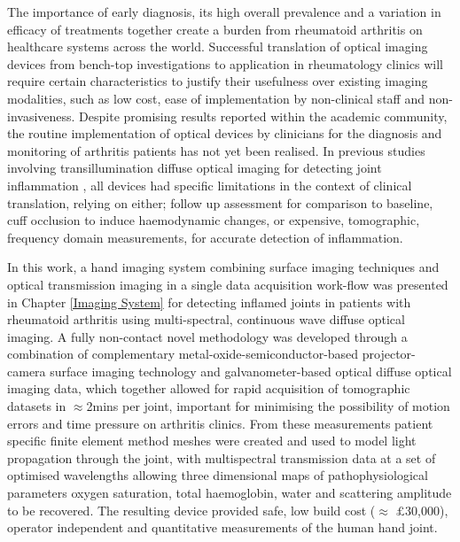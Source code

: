 \documentclass[twoside]{bhamthesis}
\theoremstyle{definition}
\begin{document}
The importance of early diagnosis, its high overall prevalence and a variation in efficacy of treatments together create a burden from rheumatoid arthritis on healthcare systems across the world. Successful translation of optical imaging devices from bench-top investigations to application in rheumatology clinics will require certain characteristics to justify their usefulness over existing imaging modalities, such as low cost, ease of implementation by non-clinical staff and non-invasiveness. Despite promising results reported within the academic community, the routine implementation of optical devices by clinicians for the diagnosis and monitoring of arthritis patients has not yet been realised. In previous studies involving transillumination diffuse optical imaging for detecting joint inflammation \cite{van2016assessment,hielscher2004sagittal,beuthan2002light,prapavat1995evaluation,prapavat1998evaluation,scheel2003laser}, all devices had specific limitations in the context of clinical translation, relying on either; follow up assessment for comparison to baseline, cuff occlusion to induce haemodynamic changes, or expensive, tomographic, frequency domain measurements, for accurate detection of inflammation.

In this work, a hand imaging system combining surface imaging techniques and optical transmission imaging in a single data acquisition work-flow was presented in Chapter \ref{Imaging System} for detecting inflamed joints in patients with rheumatoid arthritis using multi-spectral, continuous wave diffuse optical imaging. A fully non-contact novel methodology was developed through a combination of complementary metal-oxide-semiconductor-based projector-camera surface imaging technology and galvanometer-based optical diffuse optical imaging data, which together allowed for rapid acquisition of tomographic datasets in $\approx$2mins per joint, important for minimising the possibility of motion errors and time pressure on arthritis clinics. From these measurements patient specific finite element method meshes were created and used to model light propagation through the joint, with multispectral transmission data at a set of optimised wavelengths allowing three dimensional maps of pathophysiological parameters oxygen saturation, total haemoglobin, water and scattering amplitude to be recovered. The resulting device provided safe, low build cost ($\approx$ $\pounds$30,000), operator independent and quantitative measurements of the human hand joint.
\end{document}
